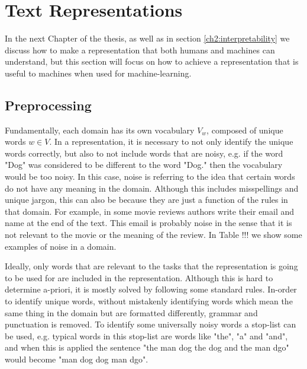








\section{Text Representations}\label{ch2:representations}




In the next Chapter of the thesis, as well as in section \ref{ch2:interpretability} we discuss how to make a representation that both humans and machines can understand, but this section will focus on how to achieve a representation that is useful to machines when used for machine-learning.


\subsection{Preprocessing}\label{ch2:data}


Fundamentally, each domain has its own vocabulary $V_w$, composed of unique words $w \in V$. In a representation, it is necessary to not only identify the unique words correctly, but also to not include words that are noisy, e.g. if the word "Dog" was considered to be different to the word "Dog." then the vocabulary would be too noisy. In this case, noise is referring to the idea that certain words do not have any meaning in the domain. Although this includes misspellings and unique jargon, this can also be because they  are just a function of the rules in that domain. For example, in some movie reviews authors write their email and name at the end of the text. This email is probably noise in the sense that it is not relevant to the movie or the meaning of the review. In Table !!! we show some examples of noise in a domain. %


 Ideally, only words that are relevant to the tasks that the representation is going to be used for are included in the representation. Although this is hard to determine a-priori, it is mostly solved by following some standard rules. In-order to identify unique words, without mistakenly identifying words which mean the same thing in the domain but are formatted differently, grammar and punctuation is removed. To identify some universally noisy words a stop-list can be used, e.g. typical words in this stop-list are words like "the", "a" and "and", and when this is applied the sentence "the man dog the dog and the man dgo" would become "man dog dog man dgo". %

